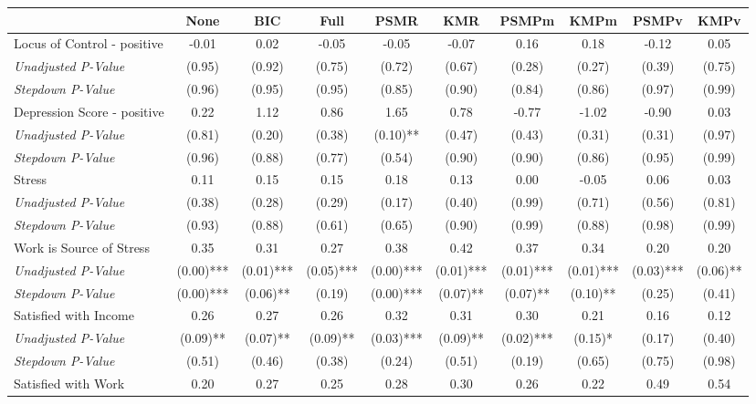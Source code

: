 \begin{tabular}{l c c c c c c c c c}
\toprule
 & None & BIC & Full & PSMR & KMR & PSMPm & KMPm & PSMPv & KMPv \\
\midrule
Locus of Control - positive & -0.01 & 0.02 & -0.05 & -0.05 & -0.07 & 0.16 & 0.18 & -0.12 & 0.05 \\
\quad \textit{Unadjusted P-Value} & (0.95) & (0.92) & (0.75) & (0.72) & (0.67) & (0.28) & (0.27) & (0.39) & (0.75) \\
\quad \textit{Stepdown P-Value} & (0.96) & (0.95) & (0.95) & (0.85) & (0.90) & (0.84) & (0.86) & (0.97) & (0.99) \\
Depression Score - positive & 0.22 & 1.12 & 0.86 & 1.65 & 0.78 & -0.77 & -1.02 & -0.90 & 0.03 \\
\quad \textit{Unadjusted P-Value} & (0.81) & (0.20) & (0.38) & (0.10)** & (0.47) & (0.43) & (0.31) & (0.31) & (0.97) \\
\quad \textit{Stepdown P-Value} & (0.96) & (0.88) & (0.77) & (0.54) & (0.90) & (0.90) & (0.86) & (0.95) & (0.99) \\
Stress & 0.11 & 0.15 & 0.15 & 0.18 & 0.13 & 0.00 & -0.05 & 0.06 & 0.03 \\
\quad \textit{Unadjusted P-Value} & (0.38) & (0.28) & (0.29) & (0.17) & (0.40) & (0.99) & (0.71) & (0.56) & (0.81) \\
\quad \textit{Stepdown P-Value} & (0.93) & (0.88) & (0.61) & (0.65) & (0.90) & (0.99) & (0.88) & (0.98) & (0.99) \\
Work is Source of Stress & 0.35 & 0.31 & 0.27 & 0.38 & 0.42 & 0.37 & 0.34 & 0.20 & 0.20 \\
\quad \textit{Unadjusted P-Value} & (0.00)*** & (0.01)*** & (0.05)*** & (0.00)*** & (0.01)*** & (0.01)*** & (0.01)*** & (0.03)*** & (0.06)** \\
\quad \textit{Stepdown P-Value} & (0.00)*** & (0.06)** & (0.19) & (0.00)*** & (0.07)** & (0.07)** & (0.10)** & (0.25) & (0.41) \\
Satisfied with Income & 0.26 & 0.27 & 0.26 & 0.32 & 0.31 & 0.30 & 0.21 & 0.16 & 0.12 \\
\quad \textit{Unadjusted P-Value} & (0.09)** & (0.07)** & (0.09)** & (0.03)*** & (0.09)** & (0.02)*** & (0.15)* & (0.17) & (0.40) \\
\quad \textit{Stepdown P-Value} & (0.51) & (0.46) & (0.38) & (0.24) & (0.51) & (0.19) & (0.65) & (0.75) & (0.98) \\
Satisfied with Work & 0.20 & 0.27 & 0.25 & 0.28 & 0.30 & 0.26 & 0.22 & 0.49 & 0.54 \\

\end{tabular}
